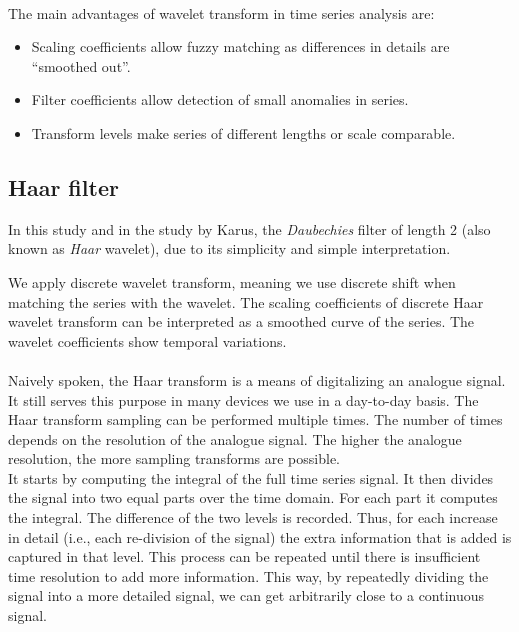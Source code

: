 \paragraph{}
The main advantages of wavelet transform in time series analysis are:
\begin{itemize}
	\item Scaling coefficients allow fuzzy matching as differences in details are
	``smoothed out''.
	\item Filter coefficients allow detection of small anomalies in series.
	\item Transform levels make series of different lengths or scale comparable.
\end{itemize}

\subsection{Haar filter}
In this study and in the study by Karus, the \emph{Daubechies }\rm filter of
length 2 (also known as \emph{Haar }\rm wavelet), due to its simplicity and
simple interpretation.

We apply discrete wavelet transform, meaning we use discrete shift when matching
the series with the wavelet. The scaling coefficients of discrete Haar wavelet
transform can be interpreted as a smoothed curve of the series. The wavelet
coefficients show temporal variations.

\paragraph{}
Naively spoken, the Haar transform is a means of digitalizing an analogue
signal. It still serves this purpose in many devices we use in a day-to-day
basis. The Haar transform sampling can be performed multiple times. The number
of times depends on the resolution of the analogue signal. The higher the
analogue resolution, the more sampling transforms are possible.\\

It starts by computing the integral of the full time series signal. It then
divides the signal into two equal parts over the time domain.
For each part it computes the integral. The difference of the two levels is
recorded. Thus, for each increase in detail (i.e., each re-division of the
signal) the extra information that is added is captured in that level. This
process can be repeated until there is insufficient time resolution to add more
information. This way, by repeatedly dividing the signal into a more detailed
signal, we can get arbitrarily close to a continuous signal.\\

